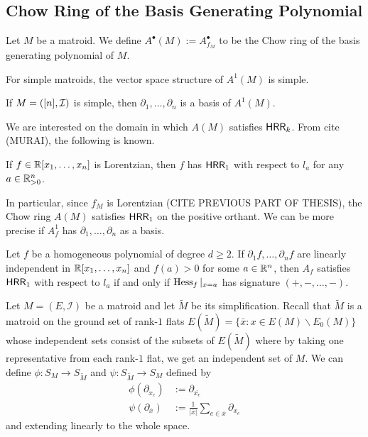 \documentclass{puthesis-UG}
\begin{document}
\subsection{Chow Ring of the Basis Generating Polynomial}

\begin{defn}
	Let $M$ be a matroid. We define $A^\bullet(M) := A^\bullet_{f_M}$ to be the Chow ring of the basis generating polynomial of $M$. 
\end{defn}

For simple matroids, the vector space structure of $A^1(M)$ is simple. 

\begin{lem} 
	If $M = ([n], \mathcal{I})$ is simple, then $\partial_1, \ldots, \partial_n$ is a basis of $A^1(M)$.
\end{lem}
We are interested on the domain in which $A(M)$ satisfies $\mathsf{HRR}_k$. From cite (MURAI), the following is known. 

\begin{thm} 
	If $f \in \mathbb{R}[x_1, \ldots, x_n]$ is Lorentzian, then $f$ has $\mathsf{HRR}_1$ with respect to $l_a$ for any $a \in \mathbb{R}_{> 0}^n$. 
\end{thm}

In particular, since $f_M$ is Lorentzian (CITE PREVIOUS PART OF THESIS), the Chow ring $A(M)$ satisfies $\mathsf{HRR}_1$ on the positive orthant. We can be more precise if $A_f^1$ has $\partial_1, \ldots, \partial_n$ as a basis. 

\begin{prop}
	Let $f$ be a homogeneous polynomial of degree $d \geq 2$. If $\partial_1 f, \ldots, \partial_n f$ are linearly independent in $\mathbb{R}[x_1, \ldots, x_n]$ and $f(a) > 0$ for some $a \in \mathbb{R}^n$, then $A_f$ satisfies $\mathsf{HRR}_1$ with respect to $l_a$ if and only if $\operatorname{Hess}_f|_{x = a}$ has signature $(+, -, \ldots, -)$. 
\end{prop}

Let $M = (E, \mathcal{I})$ be a matroid and let $\widetilde{M}$ be its simplification. Recall that $\widetilde{M}$ is a matroid on the ground set of rank-$1$ flats $E(\widetilde{M}) = \{\bar{x} : x \in E(M) \backslash E_0 (M)\}$ whose independent sets consist of the subsets of $E(\widetilde{M})$ where by taking one representative from each rank-$1$ flat, we get an independent set of $M$. We can define $\phi : S_M \to S_{\widetilde{M}}$ and $\psi : S_{\widetilde{M}} \to S_M$ defined by 
\begin{align*}
	\phi (\partial_{x_e}) & := \partial_{\overline{x_e}} \\
	\psi (\partial_{\overline{x}}) & := \frac{1}{|\overline{x}|} \sum_{e \in \overline{x}} \partial_{x_e}
\end{align*}
and extending linearly to the whole space. 
\end{document}
